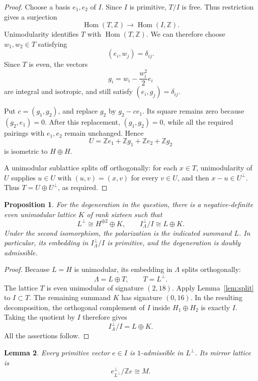 \documentclass[11pt]{amsart}
\newcommand{\Z}{\mathbb Z}
\newtheorem{lemma}{Lemma}[section]
\newtheorem{proposition}[lemma]{Proposition}
\theoremstyle{remark}
\begin{document}
\begin{proof}
Choose a basis \(e_1,e_2\) of \(I\).
Since \(I\) is primitive, \(T/I\) is free.  Thus restriction gives a
surjection
\[
 \operatorname{Hom}(T,\Z)\longrightarrow
 \operatorname{Hom}(I,\Z).
\]
Unimodularity identifies \(T\) with \(\operatorname{Hom}(T,\Z)\).
We can therefore choose \(w_1,w_2\in T\) satisfying
\[
 (e_i,w_j)=\delta_{ij}.
\]
Since \(T\) is even, the vectors
\[
 g_i=w_i-\frac{w_i^2}{2}e_i
\]
are integral and isotropic, and still satisfy
\((e_i,g_j)=\delta_{ij}\).

Put \(c=(g_1,g_2)\), and replace \(g_2\) by \(g_2-ce_1\).
Its square remains zero because \((g_2,e_1)=0\).
After this replacement, \((g_1,g_2)=0\), while all the required
pairings with \(e_1,e_2\) remain unchanged.  Hence
\[
 U=\Z e_1+\Z g_1+\Z e_2+\Z g_2
\]
is isometric to \(H\oplus H\).

A unimodular sublattice splits off orthogonally: for each \(x\in T\),
unimodularity of \(U\) supplies \(u\in U\) with
\((u,v)=(x,v)\) for every \(v\in U\), and then \(x-u\in U^\perp\).
Thus \(T=U\oplus U^\perp\), as required.
\end{proof}

\begin{proposition}\label{prop:degeneration}
For the degeneration in the question, there is a negative-definite
even unimodular lattice \(K\) of rank sixteen such that
\[
 L^\perp\cong H^{\oplus2}\oplus K,
 \qquad
 I^\perp_\Lambda/I\cong L\oplus K.
\]
Under the second isomorphism, the polarization is the indicated
summand \(L\).  In particular, its embedding in \(I^\perp_\Lambda/I\)
is primitive, and the degeneration is doubly admissible.
\end{proposition}

\begin{proof}
Because \(L=H\) is unimodular, its embedding in \(\Lambda\) splits
orthogonally:
\[
 \Lambda=L\oplus T,
 \qquad T=L^\perp.
\]
The lattice \(T\) is even unimodular of signature \((2,18)\).
Apply Lemma~\ref{lem:split} to \(I\subset T\).
The remaining summand \(K\) has signature \((0,16)\).
In the resulting decomposition, the orthogonal complement of \(I\)
inside \(H_1\oplus H_2\) is exactly \(I\).  Taking the quotient by
\(I\) therefore gives
\[
 I^\perp_\Lambda/I=L\oplus K.
\]
All the assertions follow.
\end{proof}

\begin{lemma}\label{lem:mirror}
Every primitive vector \(e\in I\) is \(1\)-admissible in \(L^\perp\).
Its mirror lattice is
\[
 e^\perp_{L^\perp}/\Z e\cong M.
\]
\end{lemma}
\end{document}
